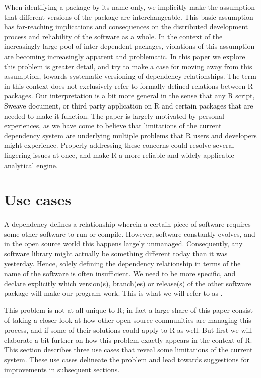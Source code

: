 When identifying a package by its name only, we implicitly make the assumption
that different versions of the package are interchangeable. This basic
assumption has far-reaching implications and consequences on the distributed
development process and reliability of the software as a whole. In the context
of the increasingly large pool of inter-dependent packages, violations of this
assumption are becoming increasingly apparent and problematic. In this paper we
explore this problem is greater detail, and try to make a case for moving away
from this assumption, towards systematic versioning of dependency relationships.
The term  in this context does not exclusively refer to formally
defined relations between R packages. Our interpretation is a bit more general in
the sense that any R script, Sweave document, or third party application
 on R and certain packages that are needed to make it function.
The paper is largely motivated by personal experiences, as we have come to
believe that limitations of the current dependency system are underlying
multiple problems that R users and developers might experience. Properly
addressing these concerns could resolve several lingering issues at once,
and make R a more reliable and widely applicable analytical engine.

\section{Use cases}

A dependency defines a relationship wherein a certain piece of software requires
some other software to run or compile. However, software constantly evolves, and in
the open source world this happens largely unmanaged. Consequently, any software
library might actually be something different today than it was yesterday.
Hence, solely defining the dependency relationship in terms of the name of the
software is often insufficient. We need to be more specific, and declare
explicitly which version(s), branch(es) or release(s) of the other software
package will make our program work. This is what we will refer to as
.

This problem is not at all unique to R; in fact a large share of this paper
consist of taking a closer look at how other open source communities are
managing this process, and if some of their solutions could apply to R as
well. But first we will elaborate a bit further on how this problem exactly
appears in the context of R. This section describes three use cases that
reveal some limitations of the current system. These use cases delineate
the problem and lead towards suggestions for improvements in subsequent sections.


